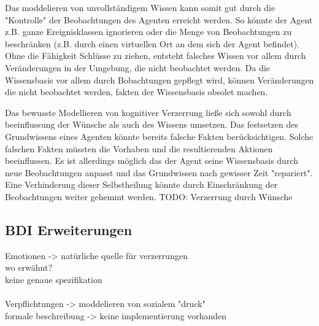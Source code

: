 Das moddelieren von unvollständigem Wissen kann somit gut durch die "Kontrolle" der Beobachtungen des Agenten erreicht werden. 
So könnte der Agent z.B. ganze Ereignisklassen ignorieren oder die Menge von Beobachtungen zu beschränken (z.B. durch einen virtuellen Ort an dem sich der Agent befindet).
Ohne die Fähigkeit Schlüsse zu ziehen, entsteht falsches Wissen vor allem durch Veränderungen in der Umgebung, die nicht beobachtet werden.
Da die Wissensbasis vor allem durch Bobachtungen gepflegt wird, können Veränderungen die nicht beobachtet werden, fakten der Wissensbasis obsolet machen.

Das bewusste Modellieren von kognitiver Verzerrung ließe sich sowohl durch beeinflussung der Wünsche als auch des Wissens umsetzen. 
Das festsetzen des Grundwissens eines Agenten könnte bereits falsche Fakten berücksichtigen. 
Solche falschen Fakten müssten die Vorhaben und die resultierenden Aktionen beeinflussen.
Es ist allerdings möglich das der Agent seine Wissensbasis durch neue Beobachtungen anpasst und das Grundwissen nach gewisser Zeit "repariert".
Eine Verhinderung dieser Selbstheilung könnte durch Einschränkung der Beobachtungen weiter gehemmt werden.
TODO: Verzerrung durch Wünsche
\subsection{BDI Erweiterungen}
Emotionen -> natürliche quelle für verzerrungen\\
wo erwähnt?\\
keine genaue spezifikation\\
\\
Verpflichtungen -> moddelieren von sozialem "druck"\\
formale beschreibung -> keine implementierung vorhanden\\

